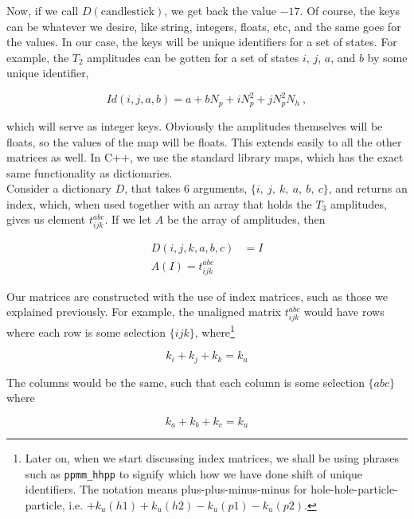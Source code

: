 	Now, if we call $D(\text{candlestick})$, we get back the value $-17$. Of course, the keys can be whatever we desire, like string, integers, floats, etc, and the same goes for the values. In our case, the keys will be unique identifiers for a set of states. For example, the $T_2$ amplitudes can be gotten for a set of states $i$, $j$, $a$, and $b$ by some unique identifier, 
	
	\begin{equation}
		Id(i,j,a,b) = a + bN_p + iN_p^2 + jN_p^2N_h\:,
	\end{equation}
	
	which will serve as integer keys. Obviously the amplitudes themselves will be floats, so the values of the map will be floats. This extends easily to all the other matrices as well. In C++, we use the standard library maps, which has the exact same functionality as dictionaries.\\
	
	Consider a dictionary $D$, that takes 6 arguments, $\{i,\:j,\:k,\:a,\:b,\:c\}$, and returns an index, which, when used together with an array that holds the $T_3$ amplitudes, gives us element $t_{ijk}^{abc}$. If we let $A$ be the array of amplitudes, then
	
	\begin{align}
	D(i,j,k,a,b,c) &= I \\
	A(I) = t_{ijk}^{abc}
	\label{Implementation | eq | "T3 element retrieval"}
	\end{align}
	
	Our matrices are constructed with the use of index matrices, such as those we explained previously. For example, the unaligned matrix $t_{ijk}^{abc}$ would have rows where each row is some selection $\{ijk\}$, where\footnote{Later on, when we start discussing index matrices, we shall be using phrases such as \texttt{ppmm\_hhpp} to signify which how we have done shift of unique identifiers. The notation means plus-plus-minus-minus for hole-hole-particle-particle, i.e. $+k_u(h1)+k_u(h2)-k_u(p1)-k_u(p2)$.}
	
	\begin{equation}
	k_i+k_j+k_k = k_u
	\end{equation}
	
	The columns would be the same, such that each column is some selection $\{abc\}$ where
	
	\begin{equation}
	k_a+k_b+k_c = k_u
	\end{equation}
	
